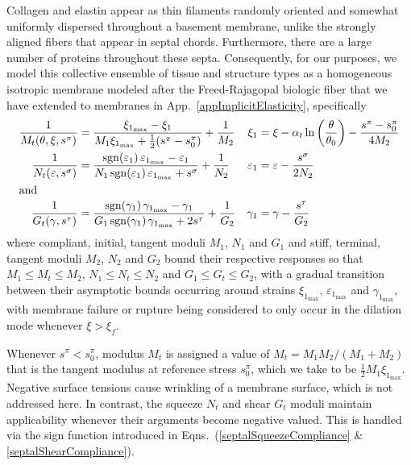Collagen and elastin appear as thin filaments randomly oriented and somewhat uniformly dispersed throughout a basement membrane, unlike the strongly aligned fibers that appear in septal chords.  Furthermore, there are a large number of proteins throughout these septa.  Consequently, for our purposes, we model this collective ensemble of tissue and structure types as a homo\-geneous isotropic membrane modeled after the Freed-Rajagopal biologic fiber \cite{FreedRajagopal16} that we have extended to membranes in App.~\ref{appImplicitElasticity}, specifically
\begin{subequations}
    \label{septalCompliances}
    \begin{align}
    \frac{1}{M_t(\theta, \xi, s^{\pi})} & = 
    \frac{\xi_{1_{\max}} - \xi_1}
    {M_1 \xi_{1_{\max}} + \tfrac{1}{2}(s^{\pi} - s^{\pi}_0)} + \frac{1}{M_2} 
    & \xi_1 & = \xi - \alpha_t \ln 
    \left( \frac{\theta}{\theta_0} \right) - \frac{s^{\pi} - s^{\pi}_0}{4M_2}
    \label{septalDilationCompliance} \\
    \frac{1}{N_t(\varepsilon , s^{\sigma})} & = \frac{ \mathrm{sgn} (\varepsilon_1) \, \varepsilon_{1_{\max}} - \varepsilon_1}{N_1 \, \mathrm{sgn} (\varepsilon_1) \, \varepsilon_{1_{\max}} + s^{\sigma}} + \frac{1}{N_2} &
    \varepsilon_1 & = \varepsilon - \frac{s^{\sigma}}{2N_2}
    \label{septalSqueezeCompliance} \\
    \intertext{and}
    \frac{1}{G_t(\gamma , s^{\tau})} & = \frac{ \mathrm{sgn} (\gamma_1) \, \gamma_{1_{\max}} - \gamma_1}{G_1 \, \mathrm{sgn} (\gamma_1) \, \gamma_{1_{\max}} + 2 s^{\tau}} + \frac{1}{G_2} & 
    \gamma_1 & = \gamma - \frac{s^{\tau}}{G_2}
    \label{septalShearCompliance}
    \end{align}
\end{subequations}
where compliant, initial, tangent moduli $M_1$, $N_1$ and $G_1$ and stiff, terminal, tangent moduli $M_2$, $N_2$ and $G_2$ bound their respective responses so that $M_1 \leq M_t \leq M_2$, $N_1 \leq N_t \leq N_2$ and $G_1 \leq G_t \leq G_2$, with a gradual transition between their asymp\-totic bounds occurring around strains $\xi_{1_{\max}}$, $\varepsilon_{1_{\max}}$ and $\gamma_{1_{\max}}$, with membrane failure or rupture being considered to only occur in the dilation mode whenever $\xi > \xi_f$.

Whenever $s^{\pi} < s^{\pi}_0$, modulus $M_t$ is assigned a value of $M_t = M_1 M_2 / ( M_1 + M_2 )$ that is the tangent modulus at reference stress $s^{\pi}_0$, which we take to be $\tfrac{1}{2} M_1 \xi_{1_{\max}}$.   Negative surface tensions cause wrinkling of a membrane surface, which is not addressed here.  In contrast, the squeeze $N_t$ and shear $G_t$ moduli maintain applicability whenever their arguments become negative valued.  This is handled via the sign function introduced in Eqns.~(\ref{septalSqueezeCompliance} \& \ref{septalShearCompliance}).

